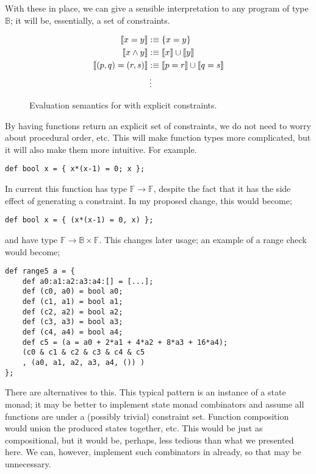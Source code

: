 \documentclass[
    9pt,            
    techreport,       
    affiltop,       
]{art}
\begin{document}
With these in place, we can give a sensible interpretation to any program of type $\mathbb{B}$; it will be, essentially, a set of constraints.

\begin{figure}[H]
\begin{align*}
    \llbracket x = y \rrbracket &:\equiv \{x = y\}\\
    \llbracket x \wedge y \rrbracket &:\equiv \llbracket x\rrbracket \cup \llbracket y\rrbracket\\
    \llbracket (p, q) = (r, s) \rrbracket &:\equiv \llbracket p = r \rrbracket \cup \llbracket q = s \rrbracket\\
    &\,\vdots
\end{align*}
\caption{Evaluation semantics for \VampIR{} with explicit constraints.}
\label{fig:evaluation-semantics}
\end{figure}

By having functions return an explicit set of constraints, we do not need to worry about procedural order, etc. This will make function types more complicated, but it will also make them more intuitive. For example.

\begin{verbatim}
def bool x = { x*(x-1) = 0; x };
\end{verbatim}

In current \VampIR{} this function has type $\mathbb{F} \rightarrow \mathbb{F}$, despite the fact that it has the side effect of generating a constraint. In my proposed change, this would become;

\begin{verbatim}
def bool x = { (x*(x-1) = 0, x) };
\end{verbatim}

and have type $\mathbb{F} \rightarrow \mathbb{B} \times \mathbb{F}$. This changes later usage; an example of a range check would become;

\begin{verbatim}
def range5 a = {
    def a0:a1:a2:a3:a4:[] = [...];
    def (c0, a0) = bool a0;
    def (c1, a1) = bool a1;
    def (c2, a2) = bool a2;
    def (c3, a3) = bool a3;
    def (c4, a4) = bool a4;
    def c5 = (a = a0 + 2*a1 + 4*a2 + 8*a3 + 16*a4);
    (c0 & c1 & c2 & c3 & c4 & c5
    , (a0, a1, a2, a3, a4, ()) )
};
\end{verbatim}

There are alternatives to this. This typical pattern is an instance of a state monad; it may be better to implement state monad combinators and assume all functions are under a (possibly trivial) constraint set. Function composition would union the produced states together, etc. This would be just as compositional, but it would be, perhaps, less tedious than what we presented here. We can, however, implement such combinators in \VampIR{} already, so that may be unnecessary.
\end{document}
